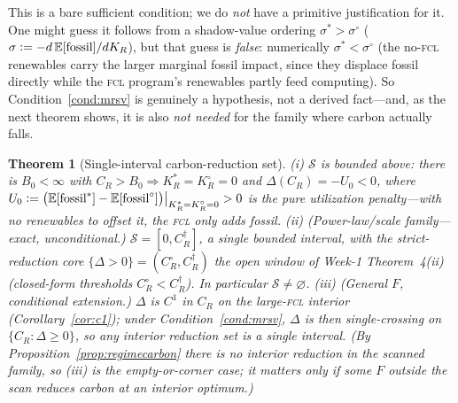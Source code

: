 \documentclass[11pt,reqno]{amsart}
\theoremstyle{plain}
\newtheorem{theorem}{Theorem}
\theoremstyle{definition}
\theoremstyle{remark}
\newcommand{\KR}{K_R}
\newcommand{\KRs}{K_R^{*}}
\newcommand{\KRo}{K_R^{\circ}}
\newcommand{\CR}{C_R}
\newcommand{\E}{\mathbb{E}}
\newcommand{\eqdef}{\vcentcolon=}
\begin{document}
This is a bare sufficient condition; we do \emph{not} have a primitive
justification for it. One might guess it follows from a shadow-value ordering
$\sigma^{*}>\sigma^{\circ}$ ($\sigma\eqdef-d\,\E[\text{fossil}]/d\KR$), but that
guess is \emph{false}: numerically $\sigma^{*}<\sigma^{\circ}$ (the no-\textsc{fcl}
renewables carry the larger marginal fossil impact, since they displace fossil
directly while the \textsc{fcl} program's renewables partly feed computing). So
Condition~\ref{cond:mrsv} is genuinely a hypothesis, not a derived fact---and, as the
next theorem shows, it is also \emph{not needed} for the family where carbon
actually falls.

\begin{theorem}[Single-interval carbon-reduction set]\label{thm:connected}
\textup{(i)} $\mathcal S$ is bounded above: there is $B_0<\infty$ with
$\CR>B_0\Rightarrow\KRs=\KRo=0$ and $\Delta(\CR)=-U_0<0$, where
$U_0\eqdef\big(\E[\text{fossil}^{*}]-\E[\text{fossil}^{\circ}]\big)\big|_{\KRs=\KRo=0}>0$
is the pure utilization penalty---with no renewables to offset it, the \textsc{fcl}
only adds fossil. \textup{(ii)} \emph{(Power-law/scale family---exact,
unconditional.)} $\mathcal S=[0,\CR^{\dagger}]$, a single bounded interval, with the
strict-reduction core $\{\Delta>0\}=(\CR^{\circ},\CR^{\dagger})$ the open window of
Week-1 Theorem~4(ii) (closed-form thresholds $\CR^{\circ}<\CR^{\dagger}$). In
particular $\mathcal S\neq\varnothing$. \textup{(iii)} \emph{(General $F$,
conditional extension.)} $\Delta$ is $C^{1}$ in $\CR$ on the large-\textsc{fcl}
interior (Corollary~\ref{cor:c1}); under Condition~\ref{cond:mrsv}, $\Delta$ is then
single-crossing on $\{\CR:\Delta\ge0\}$, so any interior reduction set is a single
interval. (By Proposition~\ref{prop:regimecarbon} there is no interior reduction in
the scanned family, so (iii) is the empty-or-corner case; it matters only if some
$F$ outside the scan reduces carbon at an interior optimum.)
\end{theorem}
\end{document}
